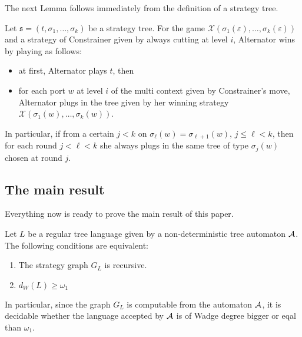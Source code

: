  The next Lemma  follows immediately from the definition of a strategy tree.
\begin{lemma}\label{lemma:short_strategy}
Let $\mathfrak{s}=(t, \sigma_1, \dots, \sigma_k)$ be a strategy tree. For the game $\mathcal{X}(\sigma_1(\varepsilon), \dots, \sigma_k(\varepsilon))$ and a strategy of Constrainer given by always cutting at level $i$, Alternator wins  by playing as follows:
\begin{itemize}
\item at first, Alternator plays $t$, then
\item for each port $w$ at level $i$ of the multi context given by Constrainer's move, Alternator plugs in the tree given by her winning strategy $\mathcal{X}(\sigma_1(w), \dots, \sigma_k(w))$.
\end{itemize}
In particular, if from a certain $j<k$ on $\sigma_\ell(w)=\sigma_{\ell+1}(w)$, $j\leq \ell < k$, then for each round $j< \ell < k$ she always plugs in the same tree of type $\sigma_j(w)$ chosen at round $j$.
\end{lemma}






\subsection{The main result}
\label{sec:the main result}
Everything now is ready to prove the main result of this paper.
\begin{theorem}\label{theorem:main}
Let $L$ be a regular tree language given by a non-deterministic tree automaton ${\mathcal A}$. The following conditions are equivalent:
\begin{enumerate}
\item The strategy graph $G_L$ is recursive.
\item $d_W(L) \geq \omega_1$
\end{enumerate}
In particular, since the graph $G_L$ is computable from the automaton ${\mathcal A}$, it is decidable whether the language accepted by ${\mathcal A}$ is of Wadge degree bigger or eqal than $\omega_1$.  
\end{theorem}

